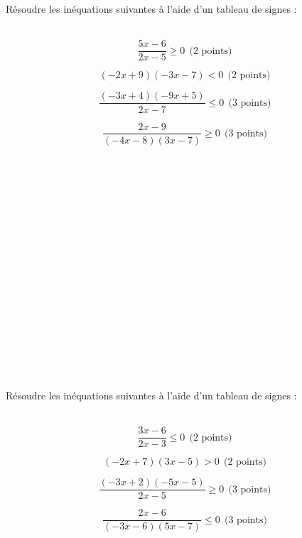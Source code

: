 \documentclass[11pt,a4paper]{article}  %
\begin{document}
	\pagestyle{empty}
	\graphicspath{{images/}}
	
	\vspace*{-2cm}
	
	\begin{center}
	\end{center}
	\ \\
	\ \\
	Résoudre les inéquations suivantes à l'aide d'un tableau de signes :
	\ \\
	\ \\
	\begin{enumMet}
		\item $$\dfrac{5x-6}{2x-5}\geqslant0\ \ \text{(2 points)}$$
		\item $$(-2x+9)(-3x-7)<0\ \ \text{(2 points)}$$
		\item $$\dfrac{(-3x+4)(-9x+5)}{2x-7}\leqslant0\ \ \text{(3 points)}$$
		\item $$\dfrac{2x-9}{(-4x-8)(3x-7)}\geqslant0\ \ \text{(3 points)}$$
	\end{enumMet}
	\ \\
	\ \\
	\ \\
	\ \\
	\ \\
	\ \\
	\ \\
	\ \\
	\ \\
	\ \\
	\ \\
	\ \\
	\ \\
	\ \\
	\begin{center}
	\end{center}
	\ \\
	\ \\
	Résoudre les inéquations suivantes à l'aide d'un tableau de signes :
	\ \\
	\ \\
	\begin{enumMet}
		\item $$\dfrac{3x-6}{2x-3}\leqslant0\ \ \text{(2 points)}$$
		\item $$(-2x+7)(3x-5)>0\ \ \text{(2 points)}$$
		\item $$\dfrac{(-3x+2)(-5x-5)}{2x-5}\geqslant0\ \ \text{(3 points)}$$
		\item $$\dfrac{2x-6}{(-3x-6)(5x-7)}\leqslant0\ \ \text{(3 points)}$$
	\end{enumMet}
	
\end{document}
